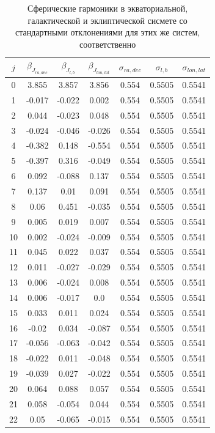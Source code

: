 \documentclass[14pt]{article} %
\begin{document}
\begin{table}[h!]
\centering
\caption{Сферические гармоники в экваториальной, галактической и эклиптической сисмете со стандартными отклонениями для этих же систем, соответственно}
\label{tabular:tgas_st}
\begin{tabular}{c|c|c|c|c|c|c}
\hline 	
$j$ &$\beta_{J_{ra,dec}}$ &$\beta_{J_{l,b}}$ &$\beta_{J_{lon,lat}}$ &$\sigma_{ra,dec}$ &$\sigma_{l,b}$ & $\sigma_{lon,lat}$\\
\hline 	
\rowcolor{Gray}
0 &3.855 &3.857 &3.856 &0.554 &0.5505 &0.5541\\
1 &-0.017 &-0.022 &0.002 &0.554 &0.5505 &0.5541\\
2 &0.044 &-0.023 &0.048 &0.554 &0.5505 &0.5541\\
3 &-0.024 &-0.046 &-0.026 &0.554 &0.5505 &0.5541\\
\rowcolor{Gray}
4 &-0.382 &0.148 &-0.554 &0.554 &0.5505 &0.5541\\
5 &-0.397 &0.316 &-0.049 &0.554 &0.5505 &0.5541\\
6 &0.092 &-0.088 &0.137 &0.554 &0.5505 &0.5541\\
7 &0.137 &0.01 &0.091 &0.554 &0.5505 &0.5541\\
8 &0.06 &0.451 &-0.035 &0.554 &0.5505 &0.5541\\
9 &0.005 &0.019 &0.007 &0.554 &0.5505 &0.5541\\
10 &0.002 &-0.024 &-0.009 &0.554 &0.5505 &0.5541\\
11 &0.045 &0.022 &0.037 &0.554 &0.5505 &0.5541\\
12 &0.011 &-0.027 &-0.029 &0.554 &0.5505 &0.5541\\
13 &0.006 &-0.024 &0.008 &0.554 &0.5505 &0.5541\\
14 &0.006 &-0.017 &0.0 &0.554 &0.5505 &0.5541\\
15 &0.033 &0.011 &0.024 &0.554 &0.5505 &0.5541\\
16 &-0.02 &0.034 &-0.087 &0.554 &0.5505 &0.5541\\
17 &-0.056 &-0.063 &-0.042 &0.554 &0.5505 &0.5541\\
18 &-0.022 &0.011 &-0.048 &0.554 &0.5505 &0.5541\\
19 &-0.039 &0.027 &-0.022 &0.554 &0.5505 &0.5541\\
20 &0.064 &0.088 &0.057 &0.554 &0.5505 &0.5541\\
21 &0.058 &-0.054 &0.044 &0.554 &0.5505 &0.5541\\
22 &0.05 &-0.065 &-0.015 &0.554 &0.5505 &0.5541\\

\end{tabular}
\end{table}
\end{document}
